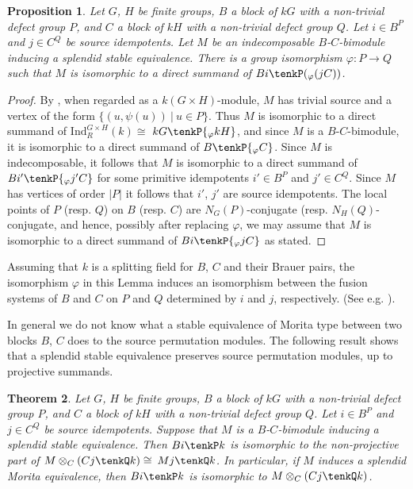 \documentclass{amsart}
\theoremstyle{plain}\newtheorem{Theorem}{Theorem}[section]
\theoremstyle{plain}\newtheorem{Conjecture}[Theorem]{Conjecture}
\theoremstyle{plain}\newtheorem{Corollary}[Theorem]{Corollary}
\theoremstyle{plain}\newtheorem{Lemma}[Theorem]{Lemma}
\theoremstyle{plain}\newtheorem{Proposition}[Theorem]{Proposition}
\theoremstyle{definition}\newtheorem{Definition}[Theorem]{Definition}
\theoremstyle{definition}\newtheorem{Example}[Theorem]{Example}
\theoremstyle{definition}\newtheorem{Examples}[Theorem]{Examples}
\theoremstyle{definition}\newtheorem{Exercise}[Theorem]{Exercise}
\theoremstyle{definition}\newtheorem{Notation}[Theorem]{Notation}
\theoremstyle{definition}\newtheorem{Remark}[Theorem]{Remark}
\theoremstyle{definition}\newtheorem{Remarks}[Theorem]{Remarks}
\theoremstyle{plain}\newtheorem{Statement}[Theorem]{}
\def\Ind{\mathrm{Ind}}    \def\tenC{\otimes_C}
\begin{document}
\begin{Proposition} \label{splendid-stable-source-Prop}
Let $G$, $H$ be finite groups, $B$ a block of $kG$ with a non-trivial defect
group $P$, and $C$ a block of $kH$ with a non-trivial defect group $Q$.
Let $i\in B^P$ and $j\in  C^Q$ be source idempotents.
Let $M$ be an indecomposable $B$-$C$-bimodule inducing a splendid
stable equivalence. There is a group isomorphism $\varphi : P\to Q$
such that $M$ is isomorphic to a direct summand of $Bi\tenkP ({_\varphi(jC)})$.
\end{Proposition}

\begin{proof}
By \cite[Proposition 9.7.1]{LiBookII}, when regarded as a $k(G\times H)$-module,
$M$ has trivial source and a vertex of the form $\{(u, \psi(u))\ |\ u\in P\}$. Thus
$M$ is isomorphic to a direct summand of $\Ind^{G\times H}_{R}(k)\cong$
$kG\tenkP {_\varphi{kH}}$, and since $M$ is a $B$-$C$-bimodule, it is
isomorphic to a direct summand of $B\tenkP {_\varphi{C}}$. 
Since $M$ is indecomposable, it follows  that $M$ is isomorphic to a direct
summand of $Bi'\tenkP {_\varphi{j'C}}$ for some primitive idempotents
$i'\in B^P$ and $j'\in C^Q$. Since $M$ has vertices of order $|P|$ it follows
that $i'$, $j'$ are source idempotents. The local points of $P$ (resp. $Q$)
on $B$ (resp. $C$) are $N_G(P)$-conjugate (resp. $N_H(Q)$-conjugate, and
hence, possibly after replacing $\varphi$, we may assume that $M$ is
isomorphic to a direct summand of $Bi\tenkP {_\varphi{jC}}$ as stated.
\end{proof}

Assuming that $k$ is a splitting field for $B$, $C$ and their Brauer pairs, the 
isomorphism  $\varphi$ in this Lemma 
induces an isomorphism between the fusion systems of  $B$ and $C$ 
on $P$ and $Q$ determined by $i$ and $j$, respectively.  (See  e.g.
\cite[Theorem 9.8.2]{LiBookII}). 

\medskip

In general we do not know what a stable equivalence of Morita type between
two blocks $B$, $C$ does to the source permutation modules. The following 
result shows that a splendid stable equivalence preserves source permutation 
modules, up to projective summands.  

\begin{Theorem} \label{splendid-stable-source}
Let $G$, $H$ be finite groups, $B$ a block of $kG$ with a non-trivial defect
group $P$, and $C$ a block of $kH$ with a non-trivial defect group $Q$.
Let $i\in B^P$ and $j\in C^Q$ be source idempotents. Suppose that $M$ is 
a $B$-$C$-bimodule inducing a splendid stable equivalence.
Then $Bi\tenkP k$ is isomorphic to the non-projective part
of $M\tenC (Cj\tenkQ k)\cong$ $Mj\tenkQ k$. In particular, if $M$ induces a  
splendid Morita equivalence, then  $Bi\tenkP k$ is isomorphic to 
$M\tenC (Cj\tenkQ k)$.
\end{Theorem}
\end{document}
